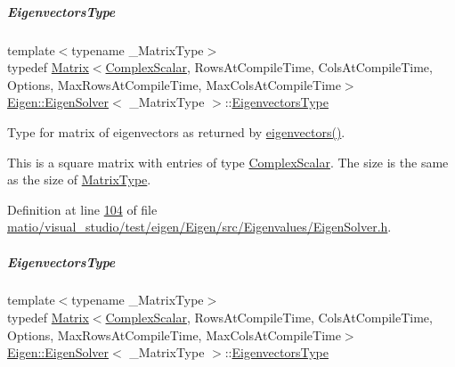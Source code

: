 \mbox{\label{group___eigenvalues___module_aa140354e2f7d5ce34c6488c39e19f2c2}} 
\subparagraph{\texorpdfstring{Eigenvectors\+Type}{EigenvectorsType}\hspace{0.1cm}{\footnotesize\ttfamily [1/2]}}
{\footnotesize\ttfamily template$<$typename \+\_\+\+Matrix\+Type$>$ \\
typedef \hyperlink{group___core___module_class_eigen_1_1_matrix}{Matrix}$<$\hyperlink{group___eigenvalues___module_a4d0b2a773357d0a6ec98e026f04002ed}{Complex\+Scalar}, Rows\+At\+Compile\+Time, Cols\+At\+Compile\+Time, Options, Max\+Rows\+At\+Compile\+Time, Max\+Cols\+At\+Compile\+Time$>$ \hyperlink{group___eigenvalues___module_class_eigen_1_1_eigen_solver}{Eigen\+::\+Eigen\+Solver}$<$ \+\_\+\+Matrix\+Type $>$\+::\hyperlink{group___eigenvalues___module_aa140354e2f7d5ce34c6488c39e19f2c2}{Eigenvectors\+Type}}



Type for matrix of eigenvectors as returned by \hyperlink{group___eigenvalues___module_a66288022802172e3ee059283b26201d7}{eigenvectors()}. 

This is a square matrix with entries of type \hyperlink{group___eigenvalues___module_a4d0b2a773357d0a6ec98e026f04002ed}{Complex\+Scalar}. The size is the same as the size of \hyperlink{group___eigenvalues___module_a83acd180404ddaac8a678fa65a6b632b}{Matrix\+Type}. 

Definition at line \hyperlink{matio_2visual__studio_2test_2eigen_2_eigen_2src_2_eigenvalues_2_eigen_solver_8h_source_l00104}{104} of file \hyperlink{matio_2visual__studio_2test_2eigen_2_eigen_2src_2_eigenvalues_2_eigen_solver_8h_source}{matio/visual\+\_\+studio/test/eigen/\+Eigen/src/\+Eigenvalues/\+Eigen\+Solver.\+h}.

\mbox{\label{group___eigenvalues___module_aa140354e2f7d5ce34c6488c39e19f2c2}} 
\subparagraph{\texorpdfstring{Eigenvectors\+Type}{EigenvectorsType}\hspace{0.1cm}{\footnotesize\ttfamily [2/2]}}
{\footnotesize\ttfamily template$<$typename \+\_\+\+Matrix\+Type$>$ \\
typedef \hyperlink{group___core___module_class_eigen_1_1_matrix}{Matrix}$<$\hyperlink{group___eigenvalues___module_a4d0b2a773357d0a6ec98e026f04002ed}{Complex\+Scalar}, Rows\+At\+Compile\+Time, Cols\+At\+Compile\+Time, Options, Max\+Rows\+At\+Compile\+Time, Max\+Cols\+At\+Compile\+Time$>$ \hyperlink{group___eigenvalues___module_class_eigen_1_1_eigen_solver}{Eigen\+::\+Eigen\+Solver}$<$ \+\_\+\+Matrix\+Type $>$\+::\hyperlink{group___eigenvalues___module_aa140354e2f7d5ce34c6488c39e19f2c2}{Eigenvectors\+Type}}



